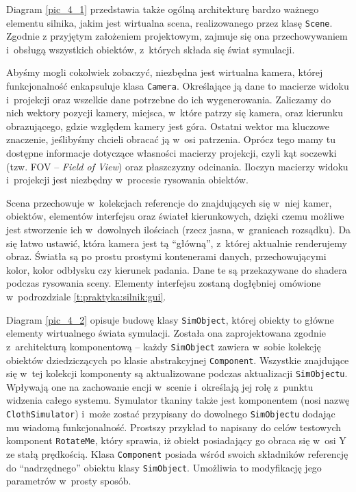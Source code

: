 		
		Diagram \ref{pic_4_1} przedstawia także ogólną architekturę bardzo ważnego elementu silnika, jakim jest wirtualna scena, realizowanego przez klasę \texttt{Scene}. Zgodnie z przyjętym założeniem projektowym, zajmuje się ona przechowywaniem i~obsługą wszystkich obiektów, z~których składa się świat symulacji. 
		
		Abyśmy mogli cokolwiek zobaczyć, niezbędna jest wirtualna kamera, której funkcjonalność enkapsuluje klasa \texttt{Camera}. Określające ją dane to macierze widoku i~projekcji oraz wszelkie dane potrzebne do ich wygenerowania. Zaliczamy do nich wektory pozycji kamery, miejsca, w~które patrzy się kamera, oraz kierunku obrazującego, gdzie względem kamery jest góra. Ostatni wektor ma kluczowe znaczenie, jeślibyśmy chcieli obracać ją w~osi patrzenia. Oprócz tego mamy tu dostępne informacje dotyczące własności macierzy projekcji, czyli kąt soczewki (tzw. FOV -- \emph{Field of View}) oraz płaszczyzny odcinania. Iloczyn macierzy widoku i~projekcji jest niezbędny w~procesie rysowania obiektów.
		
		Scena przechowuje w~kolekcjach referencje do znajdujących się w~niej kamer, obiektów, elementów interfejsu oraz świateł kierunkowych, dzięki czemu możliwe jest stworzenie ich w~dowolnych ilościach (rzecz jasna, w~granicach rozsądku). Da się łatwo ustawić, która kamera jest tą ``główną'', z~której aktualnie renderujemy obraz. Światła są po prostu prostymi kontenerami danych, przechowującymi kolor, kolor odbłysku czy kierunek padania. Dane te są przekazywane do shadera podczas rysowania sceny. Elementy interfejsu zostaną dogłębniej omówione w~podrozdziale \ref{t:praktyka:silnik:gui}.
		
		Diagram \ref{pic_4_2} opisuje budowę klasy \texttt{SimObject}, której obiekty to główne elementy wirtualnego świata symulacji. Została ona zaprojektowana zgodnie z~architekturą komponentową -- każdy \texttt{SimObject} zawiera w~sobie kolekcję obiektów dziedziczących po klasie abstrakcyjnej \texttt{Component}. Wszystkie znajdujące się w~tej kolekcji komponenty są aktualizowane podczas aktualizacji \texttt{SimObjectu}. Wpływają one na zachowanie encji w~scenie i~określają jej rolę z~punktu widzenia całego systemu. Symulator tkaniny także jest komponentem (nosi nazwę \texttt{ClothSimulator}) i~może zostać przypisany do dowolnego \texttt{SimObjectu} dodając mu wiadomą funkcjonalność. Prostszy przykład to napisany do celów testowych komponent \texttt{RotateMe}, który sprawia, iż obiekt posiadający go obraca się w~osi Y ze stałą prędkością. Klasa \texttt{Component} posiada wśród swoich składników referencję do ``nadrzędnego'' obiektu klasy \texttt{SimObject}. Umożliwia to modyfikację jego parametrów w~prosty sposób.
		
